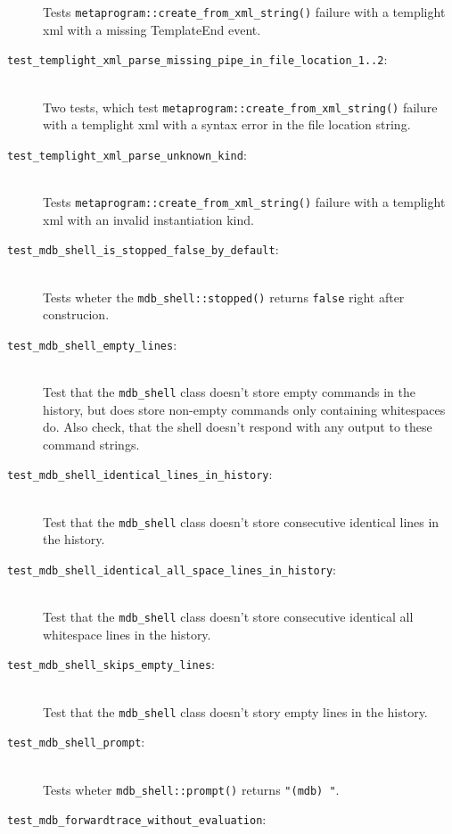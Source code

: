 \begin{description}
        Tests \texttt{metaprogram::create\_from\_xml\_string()} failure with a
        templight xml with a missing TemplateEnd event.
    \item[\texttt{test\_templight\_xml\_parse\_missing\_pipe\_in\_file\_location\_1..2}:] \hfill \\
        Two tests, which test \texttt{metaprogram::create\_from\_xml\_string()}
        failure with a templight xml with a syntax error in the file location
        string.
    \item[\texttt{test\_templight\_xml\_parse\_unknown\_kind}:] \hfill \\
        Tests \texttt{metaprogram::create\_from\_xml\_string()} failure with a
        templight xml with an invalid instantiation kind.
    \item[\texttt{test\_mdb\_shell\_is\_stopped\_false\_by\_default}:] \hfill \\
        Tests wheter the \texttt{mdb\_shell::stopped()} returns \texttt{false}
        right after construcion.
    \item[\texttt{test\_mdb\_shell\_empty\_lines}:] \hfill \\
        Test that the \texttt{mdb\_shell} class doesn't store empty commands
        in the history, but does store non-empty commands only containing
        whitespaces do. Also check, that the shell doesn't respond with any
        output to these command strings.
    \item[\texttt{test\_mdb\_shell\_identical\_lines\_in\_history}:] \hfill \\
        Test that the \texttt{mdb\_shell} class doesn't store consecutive
        identical lines in the history.
    \item[\texttt{test\_mdb\_shell\_identical\_all\_space\_lines\_in\_history}:] \hfill \\
        Test that the \texttt{mdb\_shell} class doesn't store consecutive
        identical all whitespace lines in the history.
    \item[\texttt{test\_mdb\_shell\_skips\_empty\_lines}:] \hfill \\
        Test that the \texttt{mdb\_shell} class doesn't story empty lines in
        the history.
    \item[\texttt{test\_mdb\_shell\_prompt}:] \hfill \\
        Tests wheter \texttt{mdb\_shell::prompt()} returns \texttt{"(mdb) "}.
    \item[\texttt{test\_mdb\_forwardtrace\_without\_evaluation}:] \hfill \\

\end{description}
